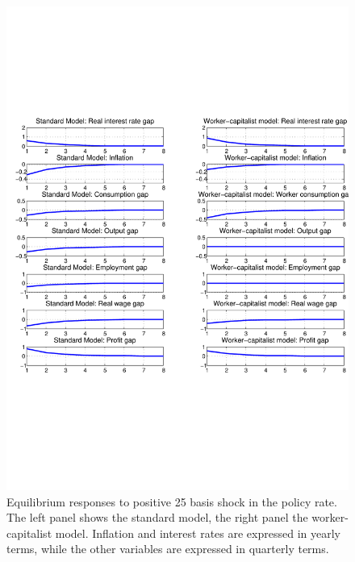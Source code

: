 \begin{figure}[ht] 
\centering 
\includegraphics[trim=0cm 7cm 0cm 6cm, clip, width=\textwidth]{./figures/monetary_std_nt.pdf} 
\caption{Equilibrium responses to positive 25 basis shock in the policy rate. The left panel shows the standard model, the right panel the worker-capitalist model. Inflation and interest rates are expressed in yearly terms, while the other variables are expressed in quarterly terms.} 
\label{fig_monetary_std_nt} 
\end{figure}